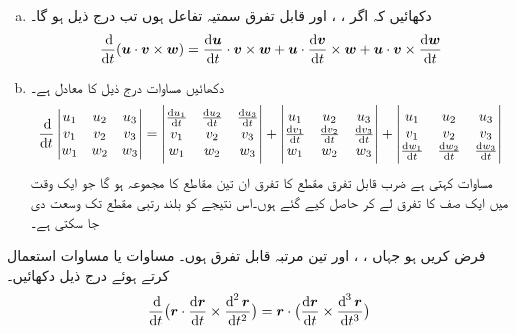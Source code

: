 \begin{enumerate}[a.]
\item
دکھائیں کہ اگر ،  ، اور  قابل تفرق سمتیہ  تفاعل ہوں تب درج ذیل ہو گا۔
\begin{align}\label{مساوات_سمتی_تفاعل_سہ_ضرب_تفرق_الف}
\frac{\dif}{\dif t}(\kvec{u}\cdot\kvec{v}\times\kvec{w})=\frac{\dif \kvec{u}}{\dif t}\cdot\kvec{v}\times\kvec{w}+\kvec{u}\cdot\frac{\dif \kvec{v}}{\dif t}\times\kvec{w}+\kvec{u}\cdot\kvec{v}\times\frac{\dif \kvec{w}}{\dif t}
\end{align}
\item
دکھائیں مساوات  درج ذیل کا معادل ہے۔
\begin{align}\label{مساوات_سمتی_تفاعل_سہ_ضرب_تفرق_ب}
\frac{\dif}{\dif t}\begin{vmatrix}u_1&u_2&u_3\\v_1&v_2&v_3\\w_1&w_2&w_3  \end{vmatrix}=
\begin{vmatrix}
\frac{\dif u_1}{\dif t}&\frac{\dif u_2}{\dif t}&\frac{\dif u_3}{\dif t}\\v_1&v_2&v_3\\w_1&w_2&w_3
\end{vmatrix}+
\begin{vmatrix}
u_1&u_2&u_3\\
\frac{\dif v_1}{\dif t}&\frac{\dif v_2}{\dif t}&\frac{\dif v_3}{\dif t}\\w_1&w_2&w_3
\end{vmatrix}+
\begin{vmatrix}
u_1&u_2&u_3\\
v_1&v_2&v_3\\
\frac{\dif w_1}{\dif t}&\frac{\dif w_2}{\dif t}&\frac{\dif w_3}{\dif t}
\end{vmatrix}
\end{align}
مساوات  کہتی ہے    ضرب    قابل تفرق مقطع کا تفرق ان تین مقاطع کا مجموعہ ہو گا جو ایک وقت میں  ایک  صف کا تفرق لے کر حاصل کیے گئے ہوں۔اس نتیجے کو بلند رتبی  مقطع تک وسعت دی جا سکتی ہے۔ 
\end{enumerate}
فرض کریں  ہو جہاں ، ،  اور   تین مرتبہ قابل  تفرق ہوں۔ مساوات  یا مساوات  استعمال کرتے ہوئے  درج ذیل دکھائیں۔
\begin{align}\label{مساوات_سمتی_تفاعل_سہ_ضرب_تفرق_پ}
\frac{\dif}{\dif t}\big(\kvec{r}\cdot\frac{\dif \kvec{r}}{\dif t}\times \frac{\dif^{\,2}\kvec{r}}{\dif t^2}\big)=\kvec{r}\cdot\big(\frac{\dif \kvec{r}}{\dif t}\times \frac{\dif^{\,3}\kvec{r}}{\dif t^3}\big)
\end{align}
